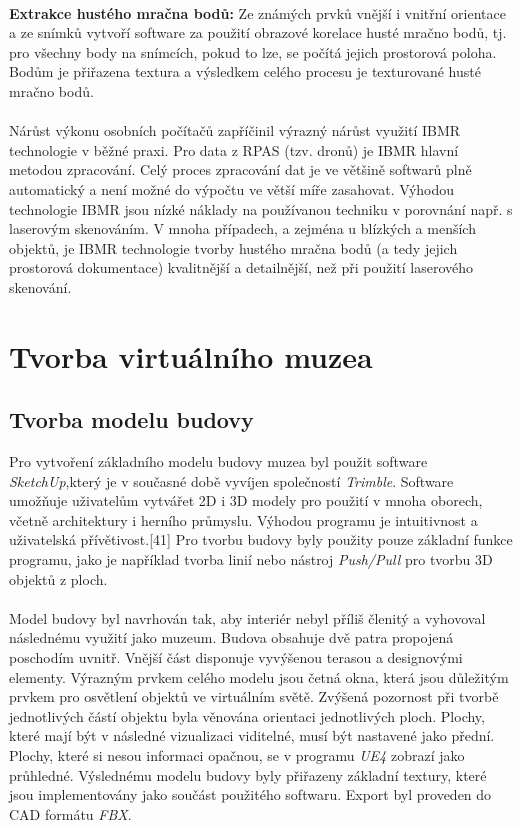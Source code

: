 \documentclass[a4paper, 12pt]{report}
\begin{document}
\\
\textbf{Extrakce hustého mračna bodů:} Ze známých prvků vnější i vnitřní orientace a ze snímků vytvoří software za použití obrazové korelace husté mračno bodů, tj. pro všechny body na snímcích, pokud to lze, se počítá jejich prostorová poloha. Bodům je přiřazena textura a výsledkem celého procesu je texturované husté mračno bodů. \\
\\
Nárůst výkonu osobních počítačů zapříčinil výrazný nárůst využití IBMR technologie v běžné praxi. Pro data z RPAS (tzv. dronů) je IBMR hlavní metodou zpracování. Celý proces zpracování dat je ve většině softwarů plně automatický a není možné do výpočtu ve větší míře zasahovat. Výhodou technologie IBMR jsou nízké náklady na používanou techniku v porovnání např. s laserovým skenováním. V mnoha případech, a zejména u blízkých a menších objektů, je IBMR technologie tvorby hustého mračna bodů (a tedy jejich prostorová dokumentace) kvalitnější a detailnější, než při použití laserového skenování.  

\chapter{Tvorba virtuálního muzea}

\section{Tvorba modelu budovy}
Pro vytvoření základního modelu budovy muzea byl použit software \textit{SketchUp},který je v současné době vyvíjen společností \textit{Trimble}. Software umožňuje uživatelům vytvářet 2D i 3D modely pro použití v mnoha oborech, včetně architektury i herního průmyslu. Výhodou programu je intuitivnost a uživatelská přívětivost.[41] Pro tvorbu budovy byly použity pouze základní funkce programu, jako je například tvorba linií nebo nástroj \textit{Push/Pull} pro tvorbu 3D objektů z ploch.\\
\\
Model budovy byl navrhován tak, aby interiér nebyl příliš členitý a vyhovoval následnému využití jako muzeum. Budova obsahuje dvě patra propojená poschodím uvnitř. Vnější část disponuje vyvýšenou terasou a designovými elementy. Výrazným prvkem celého modelu jsou četná okna, která jsou důležitým prvkem pro osvětlení objektů ve virtuálním světě. Zvýšená pozornost při tvorbě jednotlivých částí objektu byla věnována orientaci jednotlivých ploch. Plochy, které mají být v následné vizualizaci viditelné, musí být nastavené jako přední. Plochy, které si nesou informaci opačnou, se v programu \textit{UE4} zobrazí jako průhledné. Výslednému modelu budovy byly přiřazeny základní textury, které jsou implementovány jako součást použitého softwaru. Export byl proveden do CAD formátu \textit{FBX}.
\end{document}
